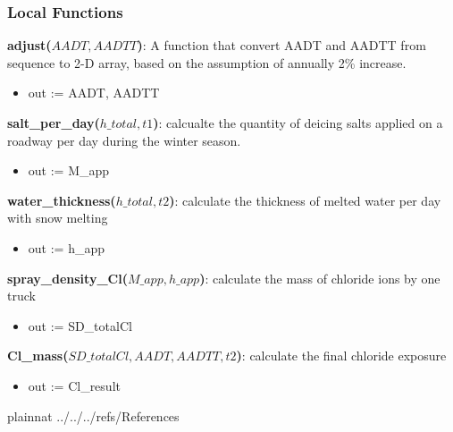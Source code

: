 \documentclass[12pt, titlepage]{article}
\begin{document}
\subsubsection{Local Functions}
\noindent \textbf{adjust($AADT, AADTT$)}: A function that convert AADT and AADTT from sequence to 2-D array, based on the assumption of annually 2\% increase.
\begin{itemize}
\item out := AADT, AADTT
\end{itemize}

\noindent \textbf{salt\_per\_day($h\_total, t1$)}: calcualte the quantity of deicing salts applied on a roadway per day during the winter season.
\begin{itemize}
\item out := M\_app
\end{itemize}

\noindent \textbf{water\_thickness($h\_total, t2$)}: calculate the thickness of melted water per day with snow melting
\begin{itemize}
\item out := h\_app
\end{itemize}

\noindent \textbf{spray\_density\_Cl($M\_app, h\_app$)}: calculate the mass of chloride ions by one truck
\begin{itemize}
\item out := SD\_totalCl
\end{itemize}

\noindent \textbf{Cl\_mass($SD\_totalCl, AADT, AADTT, t2$)}: calculate the final chloride exposure
\begin{itemize}
\item out := Cl\_result
\end{itemize}



 {plainnat}
 {../../../refs/References}

\newpage
\end{document}
